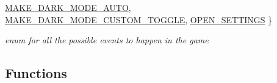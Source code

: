 \begin{DoxyCompactItemize}
\hyperlink{group__MouseTrigger_gga5667b805d857c6d28f83f6038a0272d3a009d7723ee48b87adc939ca8f9d3cc92}{M\+A\+K\+E\+\_\+\+D\+A\+R\+K\+\_\+\+M\+O\+D\+E\+\_\+\+A\+U\+TO}, 
\newline
\hyperlink{group__MouseTrigger_gga5667b805d857c6d28f83f6038a0272d3a52c640e03704fcede0775aaa3e82f456}{M\+A\+K\+E\+\_\+\+D\+A\+R\+K\+\_\+\+M\+O\+D\+E\+\_\+\+C\+U\+S\+T\+O\+M\+\_\+\+T\+O\+G\+G\+LE}, 
\hyperlink{group__MouseTrigger_gga5667b805d857c6d28f83f6038a0272d3afa80cde56ec760dde1bf913ee6d2ba50}{O\+P\+E\+N\+\_\+\+S\+E\+T\+T\+I\+N\+GS}
 \}\begin{DoxyCompactList}\small\item\em enum for all the possible events to happen in the game \end{DoxyCompactList}
\end{DoxyCompactItemize}
\subsection*{Functions}

